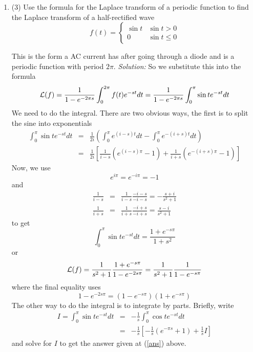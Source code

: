 \documentclass[12pt]{article}
\newcommand{\soln}{\noindent\textit{Solution:}}
\begin{document}
\begin{enumerate}
\item (3) Use the formula for the Laplace transform of a periodic function
to find the Laplace transform of  a half-rectified wave
\begin{equation}
f(t)=\left\{\begin{array}{ll}\sin{t}&\sin{t}>0\\0&\sin{t}\le 0\end{array}\right.\end{equation}
\begin{center}
\end{center}
This is the form a AC current has after going through a diode and is a periodic function with period $2\pi$.
\soln
So we substitute this into the formula
\begin{equation}
{\cal L}(f)=\frac{1}{1-e^{-2\pi s}}\int_0^{2\pi} f(t)e^{-st}dt=\frac{1}{1-e^{-2\pi s}}\int_0^\pi \sin{t}e^{-st}dt
\end{equation}
We need to do the integral. There are two obvious ways, the first is
to split the sine into exponentials
\begin{eqnarray}
\int_0^\pi \sin{t}e^{-st}dt&=&\frac{1}{2i}\left(\int_0^\pi e^{(i-s)t}dt-\int_0^\pi e^{-(i+s)t}dt\right)\nonumber\\
&=&
\frac{1}{2i}\left[\frac{1}{i-s}\left( e^{(i-s)\pi}-1\right)+\frac{1}{i+s}\left( e^{-(i+s)\pi}-1\right)\right]
\end{eqnarray}
Now, we use 
\begin{equation}
e^{i\pi}=e^{-i\pi}=-1
\end{equation}
and
\begin{eqnarray}
\frac{1}{i-s}&=&\frac{1}{i-s}\frac{-i-s}{-i-s}=-\frac{s+i}{s^2+1}\nonumber\\
\frac{1}{i+s}&=&\frac{1}{i+s}\frac{-i+s}{-i+s}=\frac{s-i}{s^2+1}
\end{eqnarray}
to get
\begin{equation}\label{ans}
\int_0^\pi \sin{t}e^{-st}dt=\frac{1+e^{-s\pi}}{1+s^2}
\end{equation}
or 
\begin{equation}
{\cal L}(f)=\frac{1}{s^2+1}\frac{1+e^{-s\pi}}{1-e^{-2s\pi}}=\frac{1}{s^2+1}\frac{1}{1-e^{-s\pi}}
\end{equation}
where the final equality uses 
\begin{equation}
1-e^{-2s\pi}=\left(1-e^{-s\pi}\right)\left(1+e^{-s\pi}\right)
\end{equation}
\vskip 1cm
The other way to do the integral is to integrate by parts. Briefly, write
\begin{eqnarray}
I=\int_0^\pi \sin{t}e^{-st}dt&=&-\frac{1}{s}\int_0^\pi\cos{t}e^{-st}dt\nonumber\\
&=&-\frac{1}{s}\left[-\frac{1}{s}\left(e^{-\pi s}+1\right)+\frac{1}{s}I\right]
\end{eqnarray}
and solve for $I$ to get the answer given at (\ref{ans}) above.


\end{enumerate}

\vfill
\end{document}
